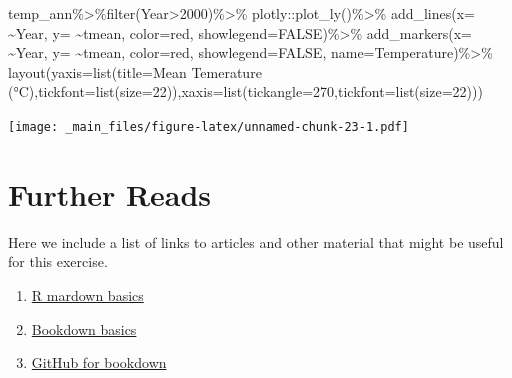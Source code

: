 \documentclass[
]{book}
\newenvironment{Shaded}{\begin{snugshade}}{\end{snugshade}}
\newcommand{\AttributeTok}[1]{\textcolor[rgb]{0.77,0.63,0.00}{#1}}
\newcommand{\ConstantTok}[1]{\textcolor[rgb]{0.00,0.00,0.00}{#1}}
\newcommand{\DecValTok}[1]{\textcolor[rgb]{0.00,0.00,0.81}{#1}}
\newcommand{\FunctionTok}[1]{\textcolor[rgb]{0.00,0.00,0.00}{#1}}
\newcommand{\NormalTok}[1]{#1}
\newcommand{\SpecialCharTok}[1]{\textcolor[rgb]{0.00,0.00,0.00}{#1}}
\newcommand{\StringTok}[1]{\textcolor[rgb]{0.31,0.60,0.02}{#1}}
\providecommand{\tightlist}{%
  \setlength{\itemsep}{0pt}\setlength{\parskip}{0pt}}
\begin{document}
\begin{Shaded}
\begin{Highlighting}[]
\NormalTok{temp\_ann}\SpecialCharTok{\%\textgreater{}\%}\FunctionTok{filter}\NormalTok{(Year}\SpecialCharTok{\textgreater{}}\DecValTok{2000}\NormalTok{)}\SpecialCharTok{\%\textgreater{}\%}\NormalTok{ plotly}\SpecialCharTok{::}\FunctionTok{plot\_ly}\NormalTok{()}\SpecialCharTok{\%\textgreater{}\%}
 \FunctionTok{add\_lines}\NormalTok{(}\AttributeTok{x=} \SpecialCharTok{\textasciitilde{}}\NormalTok{Year, }\AttributeTok{y=} \SpecialCharTok{\textasciitilde{}}\NormalTok{tmean, }\AttributeTok{color=}\StringTok{\textquotesingle{}red\textquotesingle{}}\NormalTok{, }\AttributeTok{showlegend=}\ConstantTok{FALSE}\NormalTok{)}\SpecialCharTok{\%\textgreater{}\%}
  \FunctionTok{add\_markers}\NormalTok{(}\AttributeTok{x=} \SpecialCharTok{\textasciitilde{}}\NormalTok{Year, }\AttributeTok{y=} \SpecialCharTok{\textasciitilde{}}\NormalTok{tmean, }\AttributeTok{color=}\StringTok{\textquotesingle{}red\textquotesingle{}}\NormalTok{, }\AttributeTok{showlegend=}\ConstantTok{FALSE}\NormalTok{, }\AttributeTok{name=}\StringTok{\textquotesingle{}Temperature\textquotesingle{}}\NormalTok{)}\SpecialCharTok{\%\textgreater{}\%}
  \FunctionTok{layout}\NormalTok{(}\AttributeTok{yaxis=}\FunctionTok{list}\NormalTok{(}\AttributeTok{title=}\StringTok{\textquotesingle{}Mean Temerature (°C)\textquotesingle{}}\NormalTok{,}\AttributeTok{tickfont=}\FunctionTok{list}\NormalTok{(}\AttributeTok{size=}\DecValTok{22}\NormalTok{)),}\AttributeTok{xaxis=}\FunctionTok{list}\NormalTok{(}\AttributeTok{tickangle=}\DecValTok{270}\NormalTok{,}\AttributeTok{tickfont=}\FunctionTok{list}\NormalTok{(}\AttributeTok{size=}\DecValTok{22}\NormalTok{)))}
\end{Highlighting}
\end{Shaded}

\texttt{[image: \_main\_files/figure-latex/unnamed-chunk-23-1.pdf]}

\hypertarget{further-reads}{%
\chapter{Further Reads}\label{further-reads}}

Here we include a list of links to articles and other material that might be useful for this exercise.

\begin{enumerate}
\def\labelenumi{\arabic{enumi}.}
\tightlist
\item
  \href{https://bookdown.org/yihui/rmarkdown/}{R mardown basics}
\item
  \href{https://bookdown.org/yihui/bookdown/}{Bookdown basics}
\item
  \href{https://bookdown.org/yihui/bookdown/github.html}{GitHub for bookdown}
\end{enumerate}

  
\end{document}
